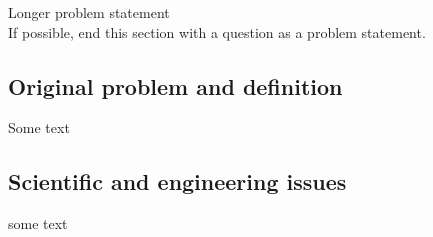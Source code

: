
Longer problem statement\\
If possible, end this section with a question as a problem statement.

\subsection{Original problem and definition}
\label{sec:researchQuestion}
Some text

\subsection{Scientific and engineering issues}
some text
